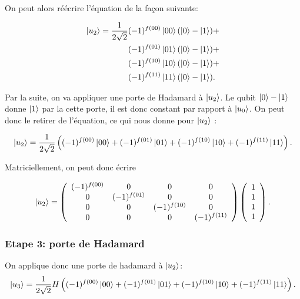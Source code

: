 On peut alors réécrire l'équation de la façon suivante: 



\begin{align*}
  \ket{u_2} = \frac{1}{2\sqrt{2}} & (-1)^{f(00)} \ket{00}  (\ket{0} - \ket{1}) + \\
&(-1)^{f(01)} \ket{01}  (\ket{0} - \ket{1}) + \\
&(-1)^{f(10)} \ket{10}  (\ket{0} - \ket{1}) + \\
&(-1)^{f(11)} \ket{11}  (\ket{0} - \ket{1}) .
\end{align*}

Par la suite, on va appliquer une porte de Hadamard à $\ket{u_2}$. Le qubit $\ket{0} - \ket{1}$ donne $\ket{1}$ par la cette porte, il est donc constant par rapport à $\ket{u_0}$. On peut donc le retirer de l'équation, ce qui nous donne pour $\ket{u_2}$ :

\begin{equation}
  \label{eq:3}
\ket{u_2} = \frac{1}{2\sqrt{2}} \left( (-1)^{f(00)} \ket{00} + (-1)^{f(01)} \ket{01} + (-1)^{f(10)} \ket{10} + (-1)^{f(11)} \ket{11} \right). 
\end{equation}


Matriciellement, on peut donc écrire

\begin{equation}
  \label{eq:4}
\ket{u_2} = \left(  \begin{array}{cccc}
     (-1)^{f(00)}  &0 & 0 &0 \\
     0 & (-1)^{f(01)} & 0 &0 \\
     0 &0 & (-1)^{f(10)} &0 \\
     0 &0 & 0 & (-1)^{f(11)} \\
        \end{array}
      \right)
      \left(  \begin{array}{c}
                1 \\
                1 \\
                1 \\
                1 
              \end{array}
      \right).
\end{equation}


\subsubsection{Etape 3: porte de Hadamard}

On applique donc une porte de hadamard à $\ket{u_2}$:
\begin{equation}
  \label{eq:5}
\ket{u_3} = \frac{1}{2\sqrt{2}} H \left( (-1)^{f(00)} \ket{00} + (-1)^{f(01)} \ket{01} + (-1)^{f(10)} \ket{10} + (-1)^{f(11)} \ket{11} \right) .
\end{equation}

